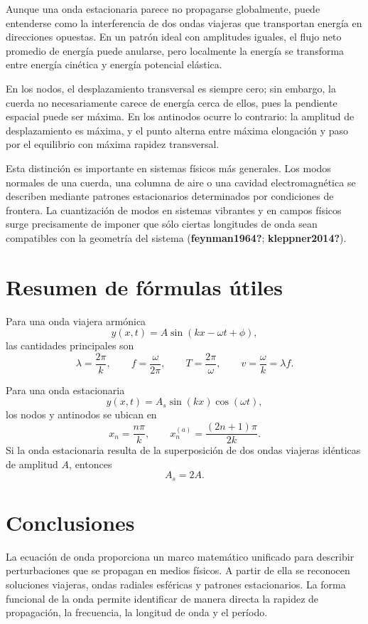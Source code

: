 \documentclass[
  letterpaper,
  DIV=11,
  numbers=noendperiod]{scrreprt}
\begin{document}
Aunque una onda estacionaria parece no propagarse globalmente, puede
entenderse como la interferencia de dos ondas viajeras que transportan
energía en direcciones opuestas. En un patrón ideal con amplitudes
iguales, el flujo neto promedio de energía puede anularse, pero
localmente la energía se transforma entre energía cinética y energía
potencial elástica.

En los nodos, el desplazamiento transversal es siempre cero; sin
embargo, la cuerda no necesariamente carece de energía cerca de ellos,
pues la pendiente espacial puede ser máxima. En los antinodos ocurre lo
contrario: la amplitud de desplazamiento es máxima, y el punto alterna
entre máxima elongación y paso por el equilibrio con máxima rapidez
transversal.

Esta distinción es importante en sistemas físicos más generales. Los
modos normales de una cuerda, una columna de aire o una cavidad
electromagnética se describen mediante patrones estacionarios
determinados por condiciones de frontera. La cuantización de modos en
sistemas vibrantes y en campos físicos surge precisamente de imponer que
sólo ciertas longitudes de onda sean compatibles con la geometría del
sistema (\textbf{feynman1964?}; \textbf{kleppner2014?}).

\section{Resumen de fórmulas
útiles}\label{resumen-de-fuxf3rmulas-uxfatiles}

Para una onda viajera armónica \[
y(x,t)=A\sin(kx-\omega t+\phi),
\] las cantidades principales son \[
\lambda=\frac{2\pi}{k}, \qquad f=\frac{\omega}{2\pi}, \qquad T=\frac{2\pi}{\omega}, \qquad v=\frac{\omega}{k}=\lambda f.
\]

Para una onda estacionaria \[
y(x,t)=A_s\sin(kx)\cos(\omega t),
\] los nodos y antinodos se ubican en \[
x_n=\frac{n\pi}{k}, \qquad x_n^{(a)}=\frac{(2n+1)\pi}{2k}.
\] Si la onda estacionaria resulta de la superposición de dos ondas
viajeras idénticas de amplitud \(A\), entonces \[
A_s=2A.
\]

\section{Conclusiones}\label{conclusiones}

La ecuación de onda proporciona un marco matemático unificado para
describir perturbaciones que se propagan en medios físicos. A partir de
ella se reconocen soluciones viajeras, ondas radiales esféricas y
patrones estacionarios. La forma funcional de la onda permite
identificar de manera directa la rapidez de propagación, la frecuencia,
la longitud de onda y el período.
\end{document}
